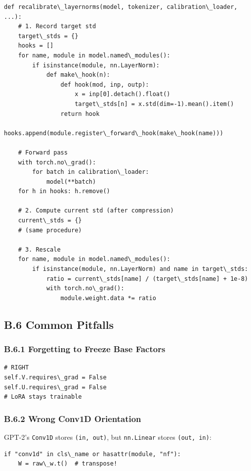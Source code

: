 \begin{lstlisting}
def recalibrate\_layernorms(model, tokenizer, calibration\_loader, ...):
    # 1. Record target std
    target\_stds = {}
    hooks = []
    for name, module in model.named\_modules():
        if isinstance(module, nn.LayerNorm):
            def make\_hook(n):
                def hook(mod, inp, outp):
                    x = inp[0].detach().float()
                    target\_stds[n] = x.std(dim=-1).mean().item()
                return hook
            hooks.append(module.register\_forward\_hook(make\_hook(name)))
    
    # Forward pass
    with torch.no\_grad():
        for batch in calibration\_loader:
            model(**batch)
    for h in hooks: h.remove()
    
    # 2. Compute current std (after compression)
    current\_stds = {}
    # (same procedure)
    
    # 3. Rescale
    for name, module in model.named\_modules():
        if isinstance(module, nn.LayerNorm) and name in target\_stds:
            ratio = current\_stds[name] / (target\_stds[name] + 1e-8)
            with torch.no\_grad():
                module.weight.data *= ratio
\end{lstlisting}

\subsection{B.6 Common Pitfalls}

\subsubsection{B.6.1 Forgetting to Freeze Base Factors}

\begin{lstlisting}
# RIGHT
self.V.requires\_grad = False
self.U.requires\_grad = False
# LoRA stays trainable
\end{lstlisting}

\subsubsection{B.6.2 Wrong Conv1D Orientation}

GPT-2's \texttt{Conv1D} stores \texttt{(in, out)}, but \texttt{nn.Linear} stores \texttt{(out, in)}:

\begin{lstlisting}
if "conv1d" in cls\_name or hasattr(module, "nf"):
    W = raw\_w.t()  # transpose!
\end{lstlisting}

